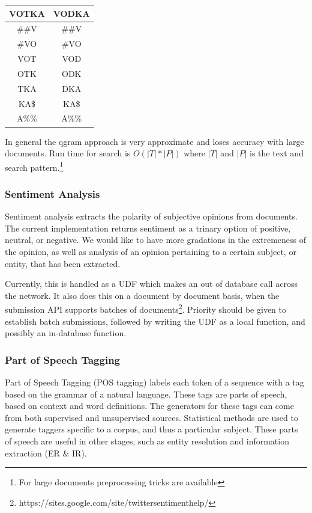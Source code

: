 \documentclass[11pt]{article}
\begin{document}
    \begin{tabular}{|c|c|}
		\hline
      \textbf{VOTKA} & \textbf{VODKA} \\ \hline
      {\color{blue}\#\#V} & {\color{blue}\#\#V} \\
		\hline
      {\color{blue}\#VO} & {\color{blue}\#VO} \\
		\hline
      {\color{red}VOT} &  {\color{red}VOD} \\
		\hline
      {\color{red} OTK} &{\color{red} ODK} \\
		\hline
      {\color{red} TKA} &{\color{red} DKA} \\
		\hline
      {\color{blue}KA\$} & {\color{blue}KA\$} \\
		\hline
      {\color{blue}A\%\%} &  {\color{blue}A\%\%} \\
		\hline
    \end{tabular}

In general the qgram approach is very approximate and loses accuracy with
large documents.
Run time for search is $O(|T|*|P|)$ where $|T|$ and $|P|$ is the text and
search pattern.\footnote{For large documents preprocessing tricks are
available}


    \subsubsection{Sentiment Analysis}
    \label{sec:SCSA}

    Sentiment analysis extracts the polarity of subjective opinions from documents.
    The current implementation returns sentiment as a trinary option of positive, neutral, or negative.
    We would like to have more gradations in the extremeness of the opinion,
    as well as analysis of an opinion pertaining to a certain subject, or entity, that has been extracted.

    Currently, this is handled as a UDF which makes an out of database call across the network.
    It also does this on a document by document basis,
    when the submission API supports batches of documents\footnote{https://sites.google.com/site/twittersentimenthelp/}.
    Priority should be given to establish batch submissions,
    followed by writing the UDF as a local function,
    and possibly an in-database function.

    \subsubsection{Part of Speech Tagging}
    Part of Speech Tagging (POS tagging) labels each token of a sequence with a tag based on the grammar of a natural language.
    These tags are parts of speech, based on context and word definitions.
    The generators for these tags can come from both supervised and unsupervised sources.
    Statistical methods are used to generate taggers specific to a corpus, and thus a particular subject.
    These parts of speech are useful in other stages, such as entity resolution and information extraction (ER \& IR).
\end{document}
